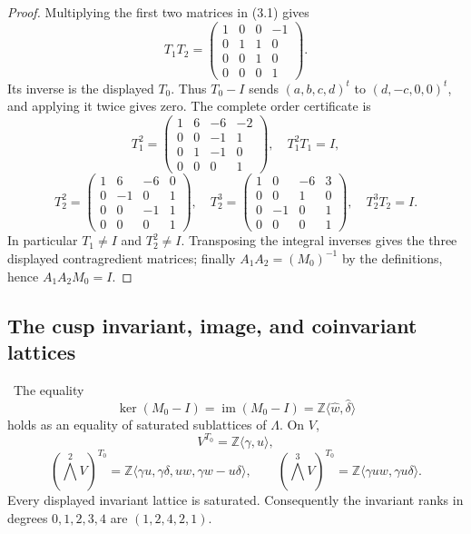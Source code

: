 \begin{proof}
Multiplying the first two matrices in (3.1) gives
\[
T_1T_2=
\begin{pmatrix}
1&0&0&-1\\0&1&1&0\\0&0&1&0\\0&0&0&1
\end{pmatrix}.
\]
Its inverse is the displayed $T_0$.  Thus
$T_0-I$ sends $(a,b,c,d)^t$ to $(d,-c,0,0)^t$, and applying it twice
gives zero.  The complete order certificate is
\[
T_1^2=
\begin{pmatrix}
1&6&-6&-2\\0&0&-1&1\\0&1&-1&0\\0&0&0&1
\end{pmatrix},
\quad T_1^2T_1=I,
\]
\[
T_2^2=
\begin{pmatrix}
1&6&-6&0\\0&-1&0&1\\0&0&-1&1\\0&0&0&1
\end{pmatrix},
\quad
T_2^3=
\begin{pmatrix}
1&0&-6&3\\0&0&1&0\\0&-1&0&1\\0&0&0&1
\end{pmatrix},
\quad T_2^3T_2=I.
\]
In particular $T_1\ne I$ and $T_2^2\ne I$.  Transposing the integral inverses gives
the three displayed contragredient matrices; finally
$A_1A_2=(M_0)^{-1}$ by the definitions, hence $A_1A_2M_0=I$.
\end{proof}

\subsection{The cusp invariant, image, and coinvariant lattices}

\begin{theorem}
\label{thm:cusp-lattices}
\Verified\ The equality
\[
 \ker(M_0-I)=\operatorname{im}(M_0-I)
 =\mathbb Z\langle\widehat w,\widehat\delta\rangle
\tag{3.2}
\]
holds as an equality of saturated sublattices of $\Lambda$.  On $V$,
\[
V^{T_0}=\mathbb Z\langle\gamma,u\rangle,
\]
\[
(\textstyle\bigwedge^2V)^{T_0}
=\mathbb Z\langle
\gamma u,\gamma\delta,uw,\gamma w-u\delta\rangle ,
\qquad
(\textstyle\bigwedge^3V)^{T_0}
=\mathbb Z\langle\gamma uw,\gamma u\delta\rangle .
\tag{3.3}
\]
Every displayed invariant lattice is saturated.  Consequently the invariant
ranks in degrees $0,1,2,3,4$ are $(1,2,4,2,1)$.
\end{theorem}

